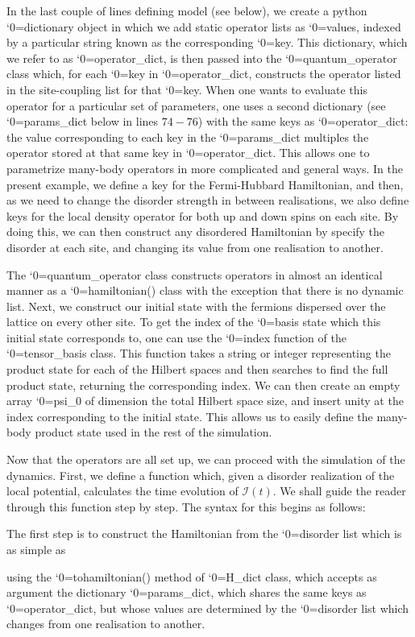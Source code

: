 \documentclass{SciPost}
\newcommand\0{\scalebox{-1}[1]{0}}
\let\svttfamily\ttfamily
\renewcommand\ttfamily{\svttfamily\catcode`0=\active }
\renewcommand\texttt{\bgroup\ttfamily\texttthelp}
\def\texttthelp#1{#1\egroup}
\newcommand{\MBLcode}{example6.py}
\begin{document}
In the last couple of lines defining model (see below), we create a python \texttt{dictionary} object in which we add static operator lists as \texttt{values}, indexed by a particular string known as the corresponding \texttt{key}. This dictionary, which we refer to as \texttt{operator\_dict}, is then passed into the \texttt{quantum\_operator} class which, for each \texttt{key} in \texttt{operator\_dict}, constructs the operator listed in the site-coupling list for that \texttt{key}. When one wants to evaluate this operator for a particular set of parameters, one uses a second dictionary (see \texttt{params\_dict} below in lines $74-76$) with the same keys as \texttt{operator\_dict}: the value corresponding to each key in the \texttt{params\_dict} multiples the operator stored at that same key in \texttt{operator\_dict}. This allows one to parametrize many-body operators in more complicated and general ways. In the present example, we define a key for the Fermi-Hubbard Hamiltonian, and then, as we need to change the disorder strength in between realisations, we also define keys for the local density operator for both up and down spins on each site. By doing this, we can then construct any disordered Hamiltonian by specify the disorder at each site, and changing its value from one realisation to another.

 

The \texttt{quantum\_operator} class constructs operators in almost an identical manner as a \texttt{hamiltonian()} class with the exception that there is no dynamic list. Next, we construct our initial state with the fermions dispersed over the lattice on every other site. To get the index of the \texttt{basis} state which this initial state corresponds to, one can use the \texttt{index} function of the \texttt{tensor\_basis} class. This function takes a string or integer representing the product state for each of the Hilbert spaces and then searches to find the full product state, returning the corresponding index. We can then create an empty array \texttt{psi\_0} of dimension the total Hilbert space size, and insert unity at the index corresponding to the initial state. This allows us to easily define the many-body product state used in the rest of the simulation.


Now that the operators are all set up, we can proceed with the simulation of the dynamics. First, we define a function which, given a disorder realization of the local potential, calculates the time evolution of $\mathcal{I}(t)$. We shall guide the reader through this function step by step. The syntax for this begins as follows:

The first step is to construct the Hamiltonian from the \texttt{disorder} list which is as simple as

using the \texttt{tohamiltonian()} method of \texttt{H\_dict} class, which accepts as argument the dictionary \texttt{params\_dict}, which shares the same keys as \texttt{operator\_dict}, but whose values are determined by the \texttt{disorder} list which changes from one realisation to another. 
\end{document}
